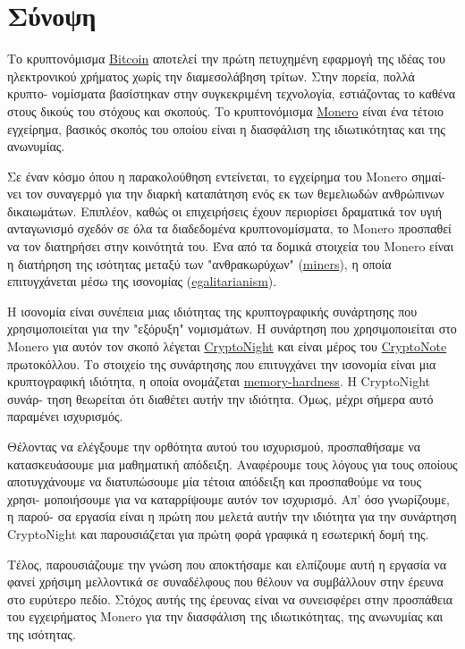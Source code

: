 %
%
\thispagestyle{empty}
\chapter*{Σύνοψη}
Το κρυπτονόμισμα \hyperref[sec:Bitcoin]{Bitcoin} αποτελεί την πρώτη πετυχημένη εφαρμογή της ιδέας του ηλεκτρονικού χρήματος χωρίς την διαμεσολάβηση τρίτων. Στην πορεία, πολλά κρυπτο- νομίσματα βασίστηκαν στην συγκεκριμένη τεχνολογία, εστιάζοντας το καθένα στους δικούς του στόχους και σκοπούς. Το κρυπτονόμισμα \hyperref[sec:Monero]{Monero} είναι ένα τέτοιο εγχείρημα, βασικός σκοπός του οποίου είναι η διασφάλιση της ιδιωτικότητας και της ανωνυμίας.

Σε έναν κόσμο όπου η παρακολούθηση εντείνεται, το εγχείρημα του Monero σημαί- νει τον συναγερμό για την διαρκή καταπάτηση ενός εκ των θεμελιωδών ανθρώπινων δικαιωμάτων. Επιπλέον, καθώς οι επιχειρήσεις έχουν περιορίσει δραματικά τον υγιή ανταγωνισμό σχεδόν σε όλα τα διαδεδομένα κρυπτονομίσματα, το Monero προσπαθεί να τον διατηρήσει στην κοινότητά του. Ένα από τα δομικά στοιχεία του Monero είναι η διατήρηση της ισότητας μεταξύ των "ανθρακωρύχων" (\hyperref[sec:mining]{miners}), η οποία επιτυγχάνεται μέσω της ισονομίας (\hyperref[sec:egalitarian]{egalitarianism}).

Η ισονομία είναι συνέπεια μιας ιδιότητας της κρυπτογραφικής συνάρτησης που χρησιμοποιείται για την "εξόρυξη" νομισμάτων. Η συνάρτηση που χρησιμοποιείται στο Monero για αυτόν τον σκοπό λέγεται \hyperref[ch:cryptonight]{CryptoNight} και είναι μέρος του \hyperref[sec:CryptoNote]{CryptoNote} πρωτοκόλλου. Το στοιχείο της συνάρτησης που επιτυγχάνει την ισονομία είναι μια κρυπτογραφική ιδιότητα, η οποία ονομάζεται \hyperref[sec:memory-hard]{memory-hardness}. Η CryptoNight συνάρ- τηση θεωρείται ότι διαθέτει αυτήν την ιδιότητα. Όμως, μέχρι σήμερα αυτό παραμένει ισχυρισμός.

Θέλοντας να ελέγξουμε την ορθότητα αυτού του ισχυρισμού, προσπαθήσαμε να κατασκευάσουμε μια μαθηματική απόδειξη. Αναφέρουμε τους λόγους για τους οποίους αποτυγχάνουμε να διατυπώσουμε μία τέτοια απόδειξη και προσπαθούμε να τους χρησι- μοποιήσουμε για να καταρρίψουμε αυτόν τον ισχυρισμό. Απ' όσο γνωρίζουμε, η παρού- σα εργασία είναι η πρώτη που μελετά αυτήν την ιδιότητα για την συνάρτηση CryptoNight και παρουσιάζεται για πρώτη φορά γραφικά η εσωτερική δομή της.

Τέλος, παρουσιάζουμε την γνώση που αποκτήσαμε και ελπίζουμε αυτή η εργασία να φανεί χρήσιμη μελλοντικά σε συναδέλφους που θέλουν να συμβάλλουν στην έρευνα στο ευρύτερο πεδίο. Στόχος αυτής της έρευνας είναι να συνεισφέρει στην προσπάθεια του εγχειρήματος Monero για την διασφάλιση της ιδιωτικότητας, της ανωνυμίας και της ισότητας.
\clearpage
%
%
\thispagestyle{empty}
\null
\clearpage
